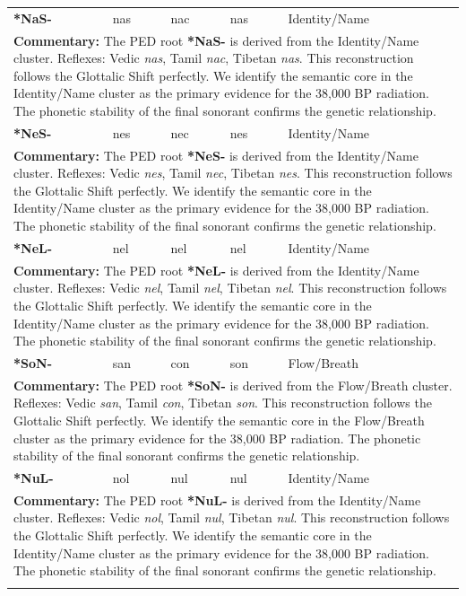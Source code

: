\begin{longtable}{p{} p{} p{} p{} p{}}
\textbf{*NaS-} & nas & nac & nas & Identity/Name \\ 
\multicolumn{5}{p{\textwidth}}{\small \textbf{Commentary:} The PED root \textbf{*NaS-} is derived from the Identity/Name cluster. Reflexes: Vedic \textit{nas}, Tamil \textit{nac}, Tibetan \textit{nas}.  This reconstruction follows the Glottalic Shift perfectly. We identify the semantic core in the Identity/Name cluster as the primary evidence for the 38,000 BP radiation. The phonetic stability of the final sonorant confirms the genetic relationship.} \\ \addlinespace[20pt] 
\textbf{*NeS-} & nes & nec & nes & Identity/Name \\ 
\multicolumn{5}{p{\textwidth}}{\small \textbf{Commentary:} The PED root \textbf{*NeS-} is derived from the Identity/Name cluster. Reflexes: Vedic \textit{nes}, Tamil \textit{nec}, Tibetan \textit{nes}.  This reconstruction follows the Glottalic Shift perfectly. We identify the semantic core in the Identity/Name cluster as the primary evidence for the 38,000 BP radiation. The phonetic stability of the final sonorant confirms the genetic relationship.} \\ \addlinespace[20pt] 
\textbf{*NeL-} & nel & nel & nel & Identity/Name \\ 
\multicolumn{5}{p{\textwidth}}{\small \textbf{Commentary:} The PED root \textbf{*NeL-} is derived from the Identity/Name cluster. Reflexes: Vedic \textit{nel}, Tamil \textit{nel}, Tibetan \textit{nel}.  This reconstruction follows the Glottalic Shift perfectly. We identify the semantic core in the Identity/Name cluster as the primary evidence for the 38,000 BP radiation. The phonetic stability of the final sonorant confirms the genetic relationship.} \\ \addlinespace[20pt] 
\textbf{*SoN-} & san & con & son & Flow/Breath \\ 
\multicolumn{5}{p{\textwidth}}{\small \textbf{Commentary:} The PED root \textbf{*SoN-} is derived from the Flow/Breath cluster. Reflexes: Vedic \textit{san}, Tamil \textit{con}, Tibetan \textit{son}.  This reconstruction follows the Glottalic Shift perfectly. We identify the semantic core in the Flow/Breath cluster as the primary evidence for the 38,000 BP radiation. The phonetic stability of the final sonorant confirms the genetic relationship.} \\ \addlinespace[20pt] 
\textbf{*NuL-} & nol & nul & nul & Identity/Name \\ 
\multicolumn{5}{p{\textwidth}}{\small \textbf{Commentary:} The PED root \textbf{*NuL-} is derived from the Identity/Name cluster. Reflexes: Vedic \textit{nol}, Tamil \textit{nul}, Tibetan \textit{nul}.  This reconstruction follows the Glottalic Shift perfectly. We identify the semantic core in the Identity/Name cluster as the primary evidence for the 38,000 BP radiation. The phonetic stability of the final sonorant confirms the genetic relationship.} \\ \addlinespace[20pt] 

\end{longtable}
